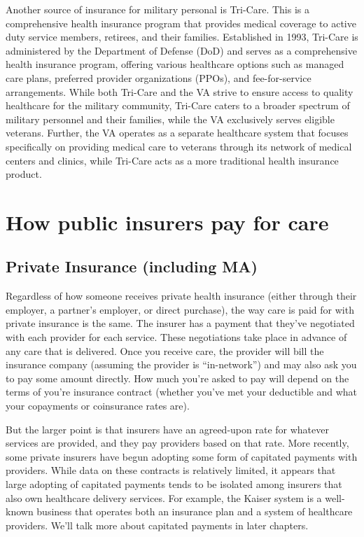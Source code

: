 \documentclass[
  letterpaper,
  DIV=11,
  numbers=noendperiod]{scrreport}
\theoremstyle{definition}
\theoremstyle{remark}
\begin{document}
Another source of insurance for military personal is Tri-Care. This is a
comprehensive health insurance program that provides medical coverage to
active duty service members, retirees, and their families. Established
in 1993, Tri-Care is administered by the Department of Defense (DoD) and
serves as a comprehensive health insurance program, offering various
healthcare options such as managed care plans, preferred provider
organizations (PPOs), and fee-for-service arrangements. While both
Tri-Care and the VA strive to ensure access to quality healthcare for
the military community, Tri-Care caters to a broader spectrum of
military personnel and their families, while the VA exclusively serves
eligible veterans. Further, the VA operates as a separate healthcare
system that focuses specifically on providing medical care to veterans
through its network of medical centers and clinics, while Tri-Care acts
as a more traditional health insurance product.

\hypertarget{how-public-insurers-pay-for-care}{%
\section{How public insurers pay for
care}\label{how-public-insurers-pay-for-care}}

\hypertarget{private-insurance-including-ma}{%
\subsection*{Private Insurance (including
MA)}\label{private-insurance-including-ma}}

Regardless of how someone receives private health insurance (either
through their employer, a partner's employer, or direct purchase), the
way care is paid for with private insurance is the same. The insurer has
a payment that they've negotiated with each provider for each service.
These negotiations take place in advance of any care that is delivered.
Once you receive care, the provider will bill the insurance company
(assuming the provider is ``in-network'') and may also ask you to pay
some amount directly. How much you're asked to pay will depend on the
terms of you're insurance contract (whether you've met your deductible
and what your copayments or coinsurance rates are).

But the larger point is that insurers have an agreed-upon rate for
whatever services are provided, and they pay providers based on that
rate. More recently, some private insurers have begun adopting some form
of capitated payments with providers. While data on these contracts is
relatively limited, it appears that large adopting of capitated payments
tends to be isolated among insurers that also own healthcare delivery
services. For example, the Kaiser system is a well-known business that
operates both an insurance plan and a system of healthcare providers.
We'll talk more about capitated payments in later chapters.
\end{document}
